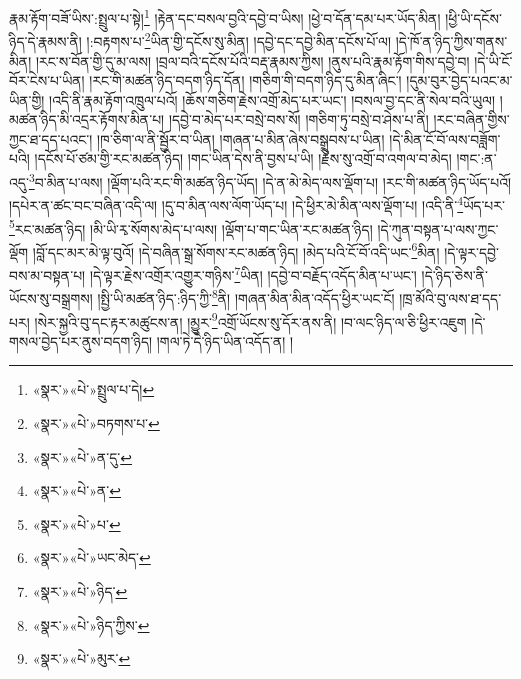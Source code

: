 རྣམ་རྟོག་བཟོ་ཡིས་:སྤྲུལ་པ་སྟེ།\footnote{«སྣར་»«པེ་»སྤྲུལ་པ་དེ།} །རྟེན་དང་བསལ་བྱའི་དབྱེ་བ་ཡིས། །ཕྱེ་བ་དོན་དམ་པར་ཡོད་མིན། །ཕྱི་ཡི་དངོས་ཉིད་དེ་རྣམས་ནི། །:བརྟགས་པ་\footnote{«སྣར་»«པེ་»བཏགས་པ་}ཡིན་གྱི་དངོས་སུ་མིན། །དབྱེ་དང་དབྱེ་མིན་དངོས་པོ་ལ། །དེ་ཁོ་ན་ཉིད་ཀྱིས་གནས་མིན། །རང་ས་བོན་གྱི་དུ་མ་ལས། །བྲལ་བའི་དངོས་པོའི་བརྡ་རྣམས་ཀྱིས། །ནུས་པའི་རྣམ་རྟོག་གིས་དབྱེ་བ། །དེ་ཡི་ངོ་བོར་ངེས་པ་ཡིན། །རང་གི་མཚན་ཉིད་བདག་ཉིད་དོན། །གཅིག་གི་བདག་ཉིད་དུ་མིན་ཞིང་། །དུམ་བུར་བྱེད་པའང་མ་ཡིན་གྱི། །འདི་ནི་རྣམ་རྟོག་འཁྲུལ་པའོ། །ཆོས་གཅིག་རྗེས་འགྲོ་མེད་པར་ཡང་། །བསལ་བྱ་དང་ནི་སེལ་བའི་ཡུལ། །མཚན་ཉིད་མི་འདྲར་རྟོགས་མིན་པ། །དབྱེ་བ་མེད་པར་བསྲེ་བས་སོ། །གཅིག་ཏུ་བསྲེ་བ་ཤེས་པ་ནི། །རང་བཞིན་གྱིས་ཀྱང་ཐ་དད་པའང་། །ཁ་ཅིག་ལ་ནི་སྦྱོར་བ་ཡིན། །གཞན་པ་མིན་ཞེས་བསྒྲུབས་པ་ཡིན། །དེ་མིན་ངོ་བོ་ལས་བཟློག་པའི། །དངོས་པོ་ཙམ་གྱི་རང་མཚན་ཉིད། །གང་ཡིན་དེས་ནི་བྱས་པ་ཡི། །རྗེས་སུ་འགྲོ་བ་འགལ་བ་མེད། །གང་:ན་འདུ་\footnote{«སྣར་»«པེ་»ན་དུ་}བ་མིན་པ་ལས། །ལྡོག་པའི་རང་གི་མཚན་ཉིད་ཡོད། །དེ་ན་མེ་མེད་ལས་ལྡོག་པ། །རང་གི་མཚན་ཉིད་ཡོད་པའོ། །དཔེར་ན་ཚང་བང་བཞིན་འདི་ལ། །དུ་བ་མིན་ལས་ལོག་ཡོད་པ། །དེ་ཕྱིར་མེ་མིན་ལས་ལྡོག་པ། །འདི་ནི་\footnote{«སྣར་»«པེ་»ན་}ཡོད་པར་\footnote{«སྣར་»«པེ་»པ་}རང་མཚན་ཉིད། །མི་ཡི་རྭ་སོགས་མེད་པ་ལས། །ལྡོག་པ་གང་ཡིན་རང་མཚན་ཉིད། །དེ་ཀུན་བསྟན་པ་ལས་ཀྱང་ལྡོག །བློ་དང་མར་མེ་ལྟ་བུའོ། །དེ་བཞིན་སྒྲ་སོགས་རང་མཚན་ཉིད། །མེད་པའི་ངོ་བོ་འདི་ཡང་\footnote{«སྣར་»«པེ་»ཡང་མེད་}མིན། །དེ་ལྟར་དབྱེ་བས་མ་བསྟན་པ། །དེ་ལྟར་རྗེས་འགྲོར་འགྱུར་གཉིས་\footnote{«སྣར་»«པེ་»ཉིད་}ཡིན། །དབྱེ་བ་བརྗོད་འདོད་མིན་པ་ཡང་། །དེ་ཉིད་ཅེས་ནི་ཡོངས་སུ་བསྒྲགས། །སྤྱི་ཡི་མཚན་ཉིད་:ཉིད་ཀྱི་\footnote{«སྣར་»«པེ་»ཉིད་ཀྱིས་}ནི། །གཞན་མིན་མིན་འདོད་ཕྱིར་ཡང་ངོ། །ཁྲ་མོའི་བུ་ལས་ཐ་དད་པར། །སེར་སྐྱའི་བུ་དང་རྟར་མཚུངས་ན། །མྱུར་\footnote{«སྣར་»«པེ་»མུར་}འགྲོ་ཡོངས་སུ་དོར་ནས་ནི། །བ་ལང་ཉིད་ལ་ཅི་ཕྱིར་འཇུག །དེ་གསལ་བྱེད་པར་ནུས་བདག་ཉིད། །གལ་ཏེ་དེ་ཉིད་ཡིན་འདོད་ན། །
